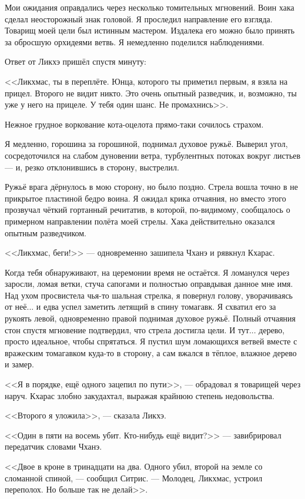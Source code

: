 Мои ожидания оправдались через несколько томительных мгновений.
Воин хака сделал неосторожный знак головой.
Я проследил направление его взгляда.
Товарищ моей цели был истинным мастером.
Издалека его можно было принять за обросшую орхидеями ветвь.
Я немедленно поделился наблюдениями.

Ответ от Ликхэ пришёл спустя минуту:

<<Ликхмас, ты в переплёте.
Юнца, которого ты приметил первым, я взяла на прицел.
Второго не видит никто.
Это очень опытный разведчик, и, возможно, ты уже у него на прицеле.
У тебя один шанс.
Не промахнись>>.

Нежное грудное воркование кота-оцелота прямо-таки сочилось страхом.

Я медленно, горошина за горошиной, поднимал духовое ружьё.
Выверил угол, сосредоточился на слабом дуновении ветра, турбулентных потоках вокруг листьев --- и, резко отклонившись в сторону, выстрелил.

Ружьё врага дёрнулось в мою сторону, но было поздно.
Стрела вошла точно в не прикрытое пластиной бедро воина.
Я ожидал крика отчаяния, но вместо этого прозвучал чёткий гортанный речитатив, в которой, по-видимому, сообщалось о примерном направлении полёта моей стрелы.
Хака действительно оказался опытным разведчиком.

<<Ликхмас, беги!>> --- одновременно зашипела Чханэ и рявкнул Кхарас.

Когда тебя обнаруживают, на церемонии время не остаётся.
Я ломанулся через заросли, ломая ветки, стуча сапогами и полностью оправдывая данное мне имя.
Над ухом просвистела чья-то шальная стрелка, я повернул голову, уворачиваясь от неё... и едва успел заметить летящий в спину томагавк.
Я схватил его за рукоять левой, одновременно правой поднимая духовое ружьё.
Полный отчаяния стон спустя мгновение подтвердил, что стрела достигла цели.
И тут... дерево, просто идеальное, чтобы спрятаться.
Я пустил шум ломающихся ветвей вместе с вражеским томагавком куда-то в сторону, а сам вжался в тёплое, влажное дерево и замер.

<<Я в порядке, ещё одного зацепил по пути>>, --- обрадовал я товарищей через наруч.
Кхарас злобно закудахтал, выражая крайнюю степень недовольства.

<<Второго я уложила>>, --- сказала Ликхэ.

<<Один в пяти на восемь убит.
Кто-нибудь ещё видит?>> --- завибрировал передатчик словами Чханэ.

<<Двое в кроне в тринадцати на два.
Одного убил, второй на земле со сломанной спиной, --- сообщил Ситрис.
--- Молодец, Ликхмас, устроил переполох.
Но больше так не делай>>.

